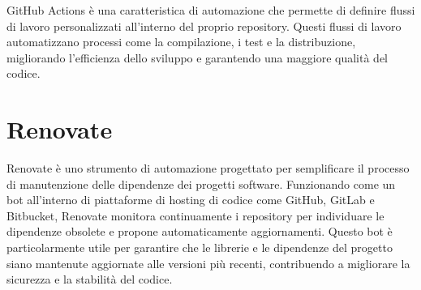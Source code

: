GitHub Actions è una caratteristica di automazione che permette di definire flussi di lavoro personalizzati all'interno del proprio repository. Questi flussi di lavoro automatizzano processi come la compilazione, i test e la distribuzione, migliorando l'efficienza dello sviluppo e garantendo una maggiore qualità del codice.

\section{Renovate}

Renovate è uno strumento di automazione progettato per semplificare il processo di manutenzione delle dipendenze dei progetti software. Funzionando come un bot all'interno di piattaforme di hosting di codice come GitHub, GitLab e Bitbucket, Renovate monitora continuamente i repository per individuare le dipendenze obsolete e propone automaticamente aggiornamenti. Questo bot è particolarmente utile per garantire che le librerie e le dipendenze del progetto siano mantenute aggiornate alle versioni più recenti, contribuendo a migliorare la sicurezza e la stabilità del codice.
